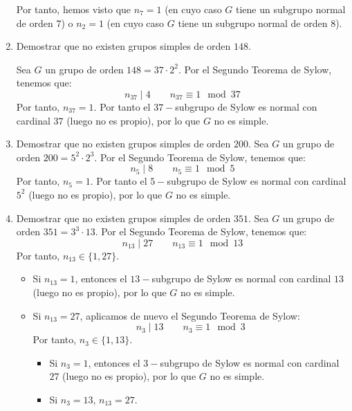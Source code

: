 \begin{ejercicio}
\begin{enumerate}
        Por tanto, hemos visto que $n_7=1$ (en cuyo caso $G$ tiene un subgrupo normal de orden $7$) o $n_2=1$ (en cuyo caso $G$ tiene un subgrupo normal de orden $8$).
        \item Demostrar que no existen grupos simples de orden $148$.
        
        Sea $G$ un grupo de orden $148=37\cdot 2^2$. Por el Segundo Teorema de Sylow, tenemos que:
        \begin{equation*}
            n_{37} \mid 4 \qquad n_{37} \equiv 1 \mod 37
        \end{equation*}
        Por tanto, $n_{37}=1$. Por tanto el $37-$subgrupo de Sylow es normal con cardinal $37$ (luego no es propio), por lo que $G$ no es simple.
        \item Demostrar que no existen grupos simples de orden $200$.
        Sea $G$ un grupo de orden $200=5^2\cdot 2^3$. Por el Segundo Teorema de Sylow, tenemos que:
        \begin{equation*}
            n_5 \mid 8 \qquad n_5 \equiv 1 \mod 5
        \end{equation*}
        Por tanto, $n_5=1$. Por tanto el $5-$subgrupo de Sylow es normal con cardinal $5^2$ (luego no es propio), por lo que $G$ no es simple.
        \item Demostrar que no existen grupos simples de orden $351$.
        Sea $G$ un grupo de orden $351=3^3\cdot 13$. Por el Segundo Teorema de Sylow, tenemos que:
        \begin{equation*}
            n_{13} \mid 27 \qquad n_{13} \equiv 1 \mod 13
        \end{equation*}
        Por tanto, $n_{13}\in \{1,27\}$.
        \begin{itemize}
            \item Si $n_{13}=1$, entonces el $13-$subgrupo de Sylow es normal con cardinal $13$ (luego no es propio), por lo que $G$ no es simple.
            \item Si $n_{13}=27$, aplicamos de nuevo el Segundo Teorema de Sylow:
            \begin{equation*}
                n_3 \mid 13 \qquad n_3 \equiv 1 \mod 3
            \end{equation*}
            Por tanto, $n_3\in \{1,13\}$.
            \begin{itemize}
                \item Si $n_3=1$, entonces el $3-$subgrupo de Sylow es normal con cardinal $27$ (luego no es propio), por lo que $G$ no es simple.
                \item Si $n_3=13$, $n_{13}=27$.

\end{itemize}
\end{itemize}
\end{enumerate}
\end{ejercicio}
